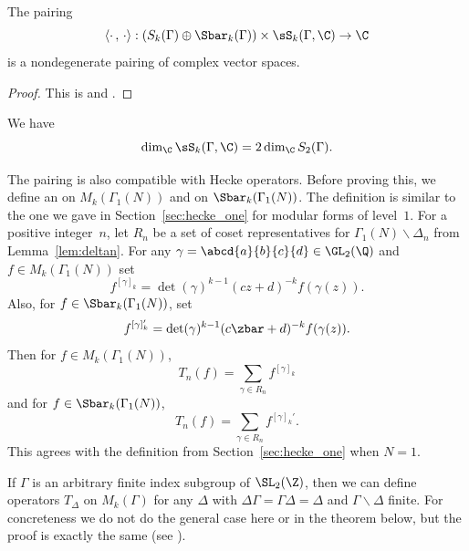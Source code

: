 \begin{theorem}[Shokoruv]\label{thm:shokoruvpairing}
The pairing 
$$
\langle \cdot\, , \, \cdot \rangle: (S_k(\Gamma) \oplus \Sbar_k(\Gamma)) 
   \times \sS_k(\Gamma,\C) \to \C
$$
is a nondegenerate pairing of complex vector spaces.
\end{theorem}
\begin{proof}
This is \cite[Thm.~0.2]{shokurov:kuga}
and \cite[\S1.5]{merel:1585}. 
\end{proof}

\begin{corollary}
We have 
$$
  \dim_\C\sS_k(\Gamma,\C) = 2\dim_\C S_2(\Gamma).
$$
\end{corollary}

The pairing is also compatible with Hecke operators.  Before proving
this, we define an  on $M_k(\Gamma_1(N))$ and
on $\Sbar_k(\Gamma_1(N))$.  The definition is similar to the one
we gave in Section~\ref{sec:hecke_one} for modular forms of level~$1$.
For a positive integer~$n$, let $R_n$ be a set of coset
representatives for $\Gamma_1(N)\backslash \Delta_n$ from
Lemma~\ref{lem:deltan}.  For any $\gamma=\abcd{a}{b}{c}{d} \in \GL_2(\Q)$
and $f\in M_k(\Gamma_1(N))$ set
$$
  f^{[\gamma]_k} = \det(\gamma)^{k-1} (cz+d)^{-k} f(\gamma(z)).
$$
Also, for $f\in \Sbar_k(\Gamma_1(N))$, set
$$
  f^{[\gamma]_k'} = \det(\gamma)^{k-1} (c\zbar+d)^{-k} f(\gamma(z)).
$$
Then for $f\in M_k(\Gamma_1(N))$, 
$$
  T_n(f) = \sum_{\gamma\in R_n} f^{[\gamma]_k}
$$
and for $f\in \Sbar_k(\Gamma_1(N))$, 
$$
  T_n(f) = \sum_{\gamma\in R_n} f^{[\gamma]_k'}.
$$
This agrees with the definition from Section~\ref{sec:hecke_one}
when $N=1$.

\begin{remark}
If $\Gamma$ is an arbitrary finite index subgroup of $\SL_2(\Z)$,
then we can define operators $T_\Delta$ on $M_k(\Gamma)$
for any $\Delta$ with $\Delta\Gamma=\Gamma\Delta = \Delta$
and $\Gamma\backslash \Delta$ finite.   For concreteness we
do not do the general case here or in the theorem below, but
the proof is exactly the same (see \cite[\S1.5]{merel:1585}).
\end{remark}

